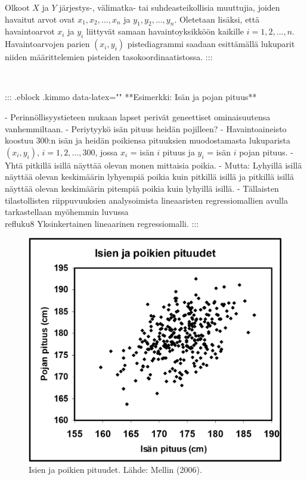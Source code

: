 \documentclass[
]{book}
\begin{document}
\begin{itemize}
Olkoot $X$ ja $Y$ järjestys-, välimatka- tai suhdeasteikollisia muuttujia, joiden havaitut arvot ovat $x_1, x_2, \ldots, x_n$ ja $y_1, y_2, \ldots, y_n$. Oletetaan lisäksi, että havaintoarvot $x_i$ ja $y_i$ liittyvät samaan havaintoyksikköön kaikille $i = 1, 2, \ldots, n$. Havaintoarvojen parien $(x_i, y_i)$ pistediagrammi saadaan esittämällä lukuparit niiden määrittelemien pisteiden tasokoordinaatistossa.
:::

\
\

::: {.eblock .kimmo data-latex="{}"}
**Esimerkki: Isän ja pojan pituus**  

- Perinnöllisyystieteen mukaan lapset perivät geneettiset ominaisuutensa vanhemmiltaan.
- Periytyykö isän pituus heidän pojilleen?
- Havaintoaineisto koostuu 300:n isän ja heidän poikiensa pituuksien muodostamasta lukuparista $(x_i , y_i),\, i = 1, 2, \ldots, 300$, jossa $x_i$ = isän $i$ pituus ja $y_i$ = isän $i$ pojan pituus.
- Yhtä pitkillä isillä näyttää olevan monen mittaisia poikia.
- Mutta: Lyhyillä isillä näyttää olevan keskimäärin lyhyempiä poikia kuin pitkillä isillä ja pitkillä isillä näyttää olevan keskimäärin pitempiä poikia kuin lyhyillä isillä.
- Tällaisten tilastollisten riippuvuuksien analysoimista lineaaristen regressiomallien avulla tarkastellaan myöhemmin luvussa \\ref{luku8} Yksinkertainen lineaarinen regressiomalli. 
:::

\begin{figure}
\includegraphics[width=16.36in]{images/Isien-poikien-pituudet-Mellin} \caption{Isien ja poikien pituudet. Lähde: Mellin (2006).}\label{fig:unnamed-chunk-11}
\end{figure}


\end{itemize}
\end{document}
